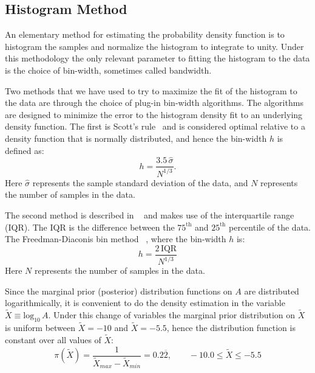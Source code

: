 \subsection{Histogram Method}
An elementary method for estimating the probability density function is to histogram the samples and normalize the histogram to integrate to unity. Under this methodology the only relevant parameter to fitting the histogram to the data is the choice of bin-width, sometimes called bandwidth.

Two methods that we have used to try to maximize the fit of the histogram to the data are through the choice of plug-in bin-width algorithms. The algorithms are designed to minimize the error to the histogram density fit to an underlying density function. The first is Scott's rule~\citep{scott1979optimal} and is considered optimal relative to a density function that is normally distributed, and hence the bin-width $h$ is defined as:
\begin{equation}
    h = \frac{3.5 \, \hat{\sigma}}{N^{1/3}}.
\end{equation}
Here $\hat{\sigma}$ represents the sample standard deviation of the data, and $N$ represents the number of samples in the data.

The second method is described in ~\cite{Freedman1981} and makes use of the interquartile range (IQR). The IQR is the difference between the $75^{\mathrm{th}}$ and $25^{\mathrm{th}}$ percentile of the data. The Freedman-Diaconis bin method ~\citep{Freedman1981}, where the bin-width $h$ is:
\begin{equation}
    h = \frac{2 \, \mathrm{IQR}}{N^{1/3}}
\end{equation}
Here $N$ represents the number of samples in the data.

Since the marginal prior (posterior) distribution functions on $A$ are distributed logarithmically, it is convenient to do the density estimation in the variable $\tilde{X} \equiv \mathrm{log}_{10} \, A$. Under this change of variables the marginal prior distribution on $\tilde{X}$ is uniform between $\tilde{X}=-10$ and $\tilde{X}=-5.5$, hence the distribution function is constant over all values of $\tilde{X}$:
\begin{equation}
    \pi\left(\tilde{X}\right) = \frac{1}{\tilde{X}_{max} - \tilde{X}_{min}} = 0.2\overbar{2}, \qquad -10.0 \leq \tilde{X} \leq -5.5
\end{equation}

